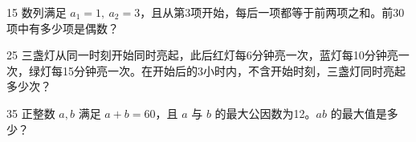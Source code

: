 

\begin{question}{1}{5}
数列满足 \(a_1=1,\ a_2=3\)，且从第3项开始，每后一项都等于前两项之和。前30项中有多少项是偶数？
\begin{choices}
\end{choices}
\end{question}

\begin{question}{2}{5}
三盏灯从同一时刻开始同时亮起，此后红灯每6分钟亮一次，蓝灯每10分钟亮一次，绿灯每15分钟亮一次。在开始后的3小时内，不含开始时刻，三盏灯同时亮起多少次？
\begin{choices}
\end{choices}
\end{question}

\begin{question}{3}{5}
正整数 \(a,b\) 满足 \(a+b=60\)，且 \(a\) 与 \(b\) 的最大公因数为12。\(ab\) 的最大值是多少？
\begin{choices}
\end{choices}
\end{question}


